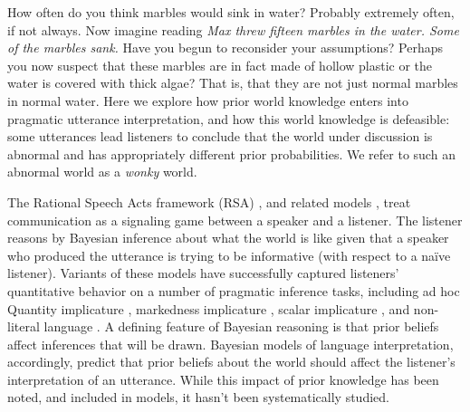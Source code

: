 \documentclass[10pt,letterpaper]{article}
\begin{document}
How often do you think marbles would sink in water? Probably extremely often, if not always. Now imagine reading \emph{Max threw fifteen marbles in the water. Some of the marbles sank.} Have you begun to reconsider your assumptions? Perhaps you now suspect that these marbles are in fact made of hollow plastic or the water is covered with thick algae? That is, that they are not just normal marbles in normal water. Here we explore how prior world knowledge enters into pragmatic utterance interpretation, and how this world knowledge is defeasible: some utterances lead listeners to conclude that the world under discussion is abnormal and has appropriately different prior probabilities. We refer to such an abnormal world  as a \emph{wonky} world.

The Rational Speech Acts framework (RSA)  \cite{frank2012,goodmanstuhlmueller2013}, and related models \cite{franke2011,russell2012}, treat communication as a signaling game \cite{lewis1969} between a speaker and a listener.
The listener reasons by Bayesian inference about what the world is like given that a speaker who produced the utterance is trying to be informative (with respect to a na\"ive listener). 
Variants of these models have successfully captured listeners' quantitative  behavior on a number of pragmatic inference tasks, including ad hoc Quantity implicature \cite{degenfrankejaeger2013}, markedness implicature \cite{bergengoodman2012}, scalar implicature \cite{goodmanstuhlmueller2013}, and non-literal language \cite{kao2014}. 
A defining feature of Bayesian reasoning is that prior beliefs affect inferences that will be drawn. Bayesian models of language interpretation, accordingly, predict that prior beliefs about the world should affect the listener's interpretation of an utterance. 
While this impact of prior knowledge has been noted, and included in models, it hasn't been systematically studied.
\end{document}
